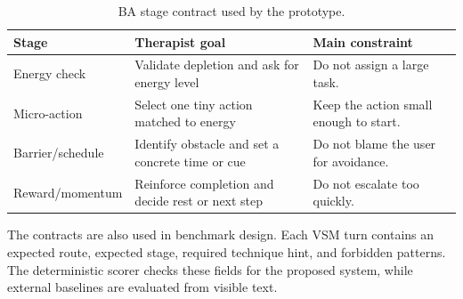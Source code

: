 \begin{table}[H]
\centering
\caption{BA stage contract used by the prototype.}
\label{tab:appendix_ba_contract}
\small
\begin{tabular}{p{}p{}p{}}
\toprule
Stage & Therapist goal & Main constraint \\
\midrule
Energy check & Validate depletion and ask for energy level & Do not assign a large task. \\
Micro-action & Select one tiny action matched to energy & Keep the action small enough to start. \\
Barrier/schedule & Identify obstacle and set a concrete time or cue & Do not blame the user for avoidance. \\
Reward/momentum & Reinforce completion and decide rest or next step & Do not escalate too quickly. \\
\bottomrule
\end{tabular}
\end{table}

The contracts are also used in benchmark design. Each VSM turn contains an expected route, expected stage, required technique hint, and forbidden patterns. The deterministic scorer checks these fields for the proposed system, while external baselines are evaluated from visible text.
